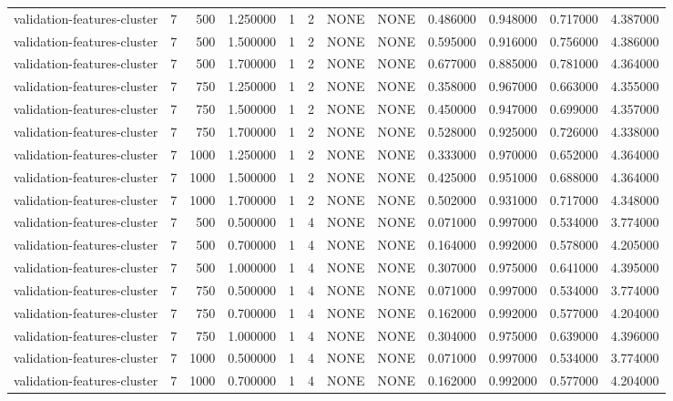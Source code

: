\begin{tabular}{lrrrllllrrrr}
validation-features-cluster & 7 & 500 & 1.250000 & 1 & 2 & NONE & NONE & 0.486000 & 0.948000 & 0.717000 & 4.387000 \\
validation-features-cluster & 7 & 500 & 1.500000 & 1 & 2 & NONE & NONE & 0.595000 & 0.916000 & 0.756000 & 4.386000 \\
validation-features-cluster & 7 & 500 & 1.700000 & 1 & 2 & NONE & NONE & 0.677000 & 0.885000 & 0.781000 & 4.364000 \\
validation-features-cluster & 7 & 750 & 1.250000 & 1 & 2 & NONE & NONE & 0.358000 & 0.967000 & 0.663000 & 4.355000 \\
validation-features-cluster & 7 & 750 & 1.500000 & 1 & 2 & NONE & NONE & 0.450000 & 0.947000 & 0.699000 & 4.357000 \\
validation-features-cluster & 7 & 750 & 1.700000 & 1 & 2 & NONE & NONE & 0.528000 & 0.925000 & 0.726000 & 4.338000 \\
validation-features-cluster & 7 & 1000 & 1.250000 & 1 & 2 & NONE & NONE & 0.333000 & 0.970000 & 0.652000 & 4.364000 \\
validation-features-cluster & 7 & 1000 & 1.500000 & 1 & 2 & NONE & NONE & 0.425000 & 0.951000 & 0.688000 & 4.364000 \\
validation-features-cluster & 7 & 1000 & 1.700000 & 1 & 2 & NONE & NONE & 0.502000 & 0.931000 & 0.717000 & 4.348000 \\
validation-features-cluster & 7 & 500 & 0.500000 & 1 & 4 & NONE & NONE & 0.071000 & 0.997000 & 0.534000 & 3.774000 \\
validation-features-cluster & 7 & 500 & 0.700000 & 1 & 4 & NONE & NONE & 0.164000 & 0.992000 & 0.578000 & 4.205000 \\
validation-features-cluster & 7 & 500 & 1.000000 & 1 & 4 & NONE & NONE & 0.307000 & 0.975000 & 0.641000 & 4.395000 \\
validation-features-cluster & 7 & 750 & 0.500000 & 1 & 4 & NONE & NONE & 0.071000 & 0.997000 & 0.534000 & 3.774000 \\
validation-features-cluster & 7 & 750 & 0.700000 & 1 & 4 & NONE & NONE & 0.162000 & 0.992000 & 0.577000 & 4.204000 \\
validation-features-cluster & 7 & 750 & 1.000000 & 1 & 4 & NONE & NONE & 0.304000 & 0.975000 & 0.639000 & 4.396000 \\
validation-features-cluster & 7 & 1000 & 0.500000 & 1 & 4 & NONE & NONE & 0.071000 & 0.997000 & 0.534000 & 3.774000 \\
validation-features-cluster & 7 & 1000 & 0.700000 & 1 & 4 & NONE & NONE & 0.162000 & 0.992000 & 0.577000 & 4.204000 \\

\end{tabular}
